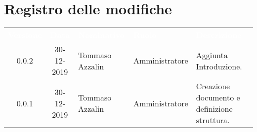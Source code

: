 \section*{Registro delle modifiche}
{
\renewcommand{\arraystretch}{1.5}
\centering
\begin{longtable}{ c c  C{4cm}  C{3cm} C{4cm}}
\textcolor{white}{\textbf{Versione}} & \textcolor{white}{\textbf{Data}} & \textcolor{white}{\textbf{Nominativo}} & \textcolor{white}{\textbf{Ruolo}} & \textcolor{white}{\textbf{Descrizione}}\\	


0.0.2 & 30-12-2019 & Tommaso Azzalin & Amministratore & Aggiunta Introduzione. \\
0.0.1 & 30-12-2019 & Tommaso Azzalin & Amministratore & Creazione documento e definizione struttura.  \\	
	
		
\end{longtable}
}
